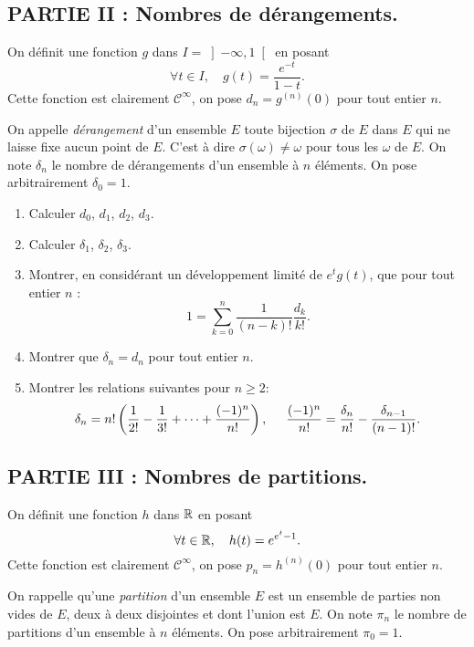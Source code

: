 \subsection*{PARTIE II : Nombres de d{\'e}rangements.}

On d{\'e}finit une fonction $g$ dans $I=\left] -\infty ,1\right[ $ en posant
\[
\forall t\in I,\quad g(t)=\frac{e^{-t}}{1-t}.
\]
Cette fonction est clairement $\mathcal{C}^{\infty }$, on pose $d_{n}=g^{(n)}(0)$ pour tout entier $n$.

On appelle \emph{d{\'e}rangement} d'un ensemble $E$ toute bijection $\sigma$ de $E$ dans $E$ qui ne laisse fixe aucun point de $E$. C'est {\`a} dire $\sigma (\omega )\neq \omega $ pour tous les $\omega $ de $E$. On note $\delta _{n}$ le nombre de d{\'e}rangements d'un ensemble {\`a} $n$ {\'e}l{\'e}ments. On pose arbitrairement $\delta _{0} = 1$.

\begin{enumerate}
\item  Calculer $d_{0}$, $d_{1}$, $d_{2}$, $d_{3}$.

\item  Calculer $\delta _{1}$, $\delta _{2}$, $\delta _{3}$.

\item  Montrer, en consid{\'e}rant un d{\'e}veloppement limit{\'e} de $e^{t}g(t)$, que pour tout entier $n$ :
\[
1 = \sum_{k=0}^{n}\frac{1}{(n-k)!}\frac{d_{k}}{k!}.
\]

\item  Montrer que $\delta _{n}=d_{n}$ pour tout entier $n$.

\item  Montrer les relations suivantes pour $n\geq 2$:
\[
\delta _{n} = n!\left( \frac{1}{2!} - \frac{1}{3!} + \cdots + \frac{(-1)^{n}}{n!}\right), \hspace{0.5cm}
\frac{(-1)^{n}}{n!} = \frac{\delta_{n}}{n!} - \frac{\delta_{n-1}}{(n-1)!}.
\]
\end{enumerate}

\subsection*{PARTIE III : Nombres de partitions.}

On d{\'e}finit une fonction $h$ dans $\mathbb{R}$ en posant
\[
\forall t\in \mathbb{R},\quad h(t)=e^{e^{t}-1}.
\]
Cette fonction est clairement $\mathcal{C}^{\infty }$, on pose $p_{n}=h^{(n)}(0)$ pour tout entier $n$.

On rappelle qu'une \emph{partition} d'un ensemble $E$ est un ensemble de parties non vides de $E$, deux {\`a} deux disjointes et dont l'union est $E$. On note $\pi _{n}$ le nombre de partitions d'un ensemble {\`a} $n$ {\'e}l{\'e}ments. On pose arbitrairement $\pi _{0}=1$.

